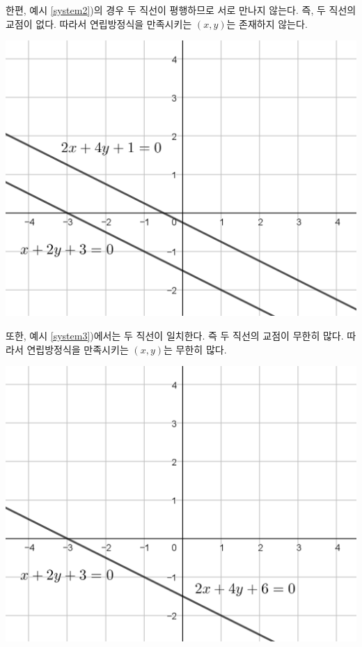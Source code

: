 \documentclass{oblivoir}
\begin{document}
\clearpage
한편, 예시 \ref{system2})의 경우 두 직선이 평행하므로 서로 만나지 않는다.
즉, 두 직선의 교점이 없다.
따라서 연립방정식을 만족시키는 \((x,y)\)는 존재하지 않는다.

\begin{center}
\includegraphics{system_examples_02}
\end{center}

또한, 예시 \ref{system3})에서는 두 직선이 일치한다.
즉 두 직선의 교점이 무한히 많다.
따라서 연립방정식을 만족시키는 \((x,y)\)는 무한히 많다.

\begin{center}
\includegraphics{system_examples_03}
\end{center}
\end{document}
